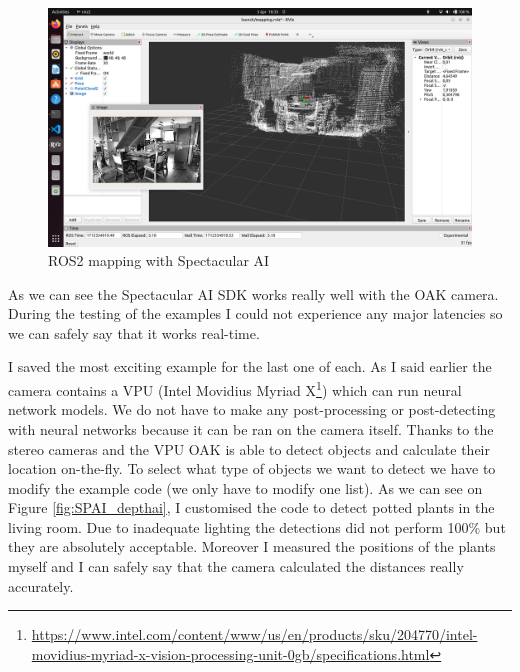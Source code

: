 \begin{figure}[H]
	\centering
	\includegraphics[width=150mm, keepaspectratio]{figures/spectacular_ai_mapping_ros2.png}
	\caption{ROS2 mapping with Spectacular AI}
	\label{fig:SPAI_ros_mapping}
\end{figure}

As we can see the Spectacular AI SDK works really well with the OAK camera. During the testing of the examples I could not experience any major latencies so we can safely say that it works real-time.

I saved the most exciting example for the last one of each. As I said earlier the camera contains a VPU (Intel Movidius Myriad X\footnote{\url{https://www.intel.com/content/www/us/en/products/sku/204770/intel-movidius-myriad-x-vision-processing-unit-0gb/specifications.html}}) which can run neural network models. We do not have to make any post-processing or post-detecting with neural networks because it can be ran on the camera itself. Thanks to the stereo cameras and the VPU OAK is able to detect objects and calculate their location on-the-fly. To select what type of objects we want to detect we have to modify the example code (we only have to modify one list). As we can see on Figure \ref{fig:SPAI_depthai}, I customised the code to detect potted plants in the living room. Due to inadequate lighting the detections did not perform 100\% but they are absolutely acceptable. Moreover I measured the positions of the plants myself and I can safely say that the camera calculated the distances really accurately.

